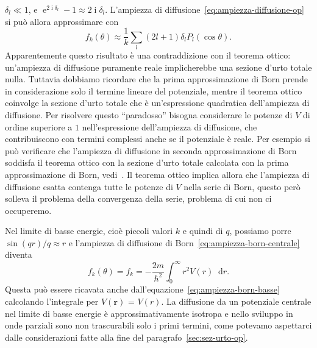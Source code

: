 \documentclass[a4paper,fleqn,twoside,12pt]{article}
\newcommand*{\dd}{\mathop{}\!\mathrm{d}} %
\DeclareMathOperator{\e}{\mathrm{e}} %
\DeclareMathOperator{\uimm}{\mathrm{i}} %
\begin{document}
$\delta_{l} \ll 1$, e $\e^{2\uimm \delta_{l}} - 1 \approx 2\uimm \delta_{l}$.
L'ampiezza di diffusione~\eqref{eq:ampiezza-diffusione-op} si può allora
approssimare con
\begin{equation}
  f_{k}(\theta) \approx \frac{1}{k}\sum_{l}(2l+1) \delta_{l} P_{l}(\cos\theta).
\end{equation}
Apparentemente questo risultato è una contraddizione con il teorema ottico:
un'ampiezza di diffusione puramente reale implicherebbe una sezione d'urto
totale nulla.  Tuttavia dobbiamo ricordare che la prima approssimazione di Born
prende in considerazione solo il termine lineare del potenziale, mentre il
teorema ottico coinvolge la sezione d'urto totale che è un'espressione
quadratica dell'ampiezza di diffusione.  Per risolvere questo ``paradosso''
bisogna considerare le potenze di $V$ di ordine superiore a $1$ nell'espressione
dell'ampiezza di diffusione, che contribuiscono con termini complessi anche se
il potenziale è reale.  Per esempio si può verificare che l'ampiezza di
diffusione in seconda approssimazione di Born soddisfa il teorema ottico con la
sezione d'urto totale calcolata con la prima approssimazione di Born,
vedi~\textcite[361-362]{gottfried:quantum-mechanics}.  Il teorema ottico implica
allora che l'ampiezza di diffusione esatta contenga tutte le potenze di $V$
nella serie di Born, questo però solleva il problema della convergenza della
serie, problema di cui non ci occuperemo.

Nel limite di basse energie, cioè piccoli valori $k$ e quindi di $q$, possiamo
porre $\sin(qr)/q \approx r$ e l'ampiezza di diffusione di
Born~\eqref{eq:ampiezza-born-centrale} diventa
\begin{equation}
  \label{eq:ampiezza-born-centrale-basse}
  f_{k}(\theta) = f_{k} = -\frac{2m}{\hslash^{2}} \int_{0}^{\infty} r^{2}V(r)
  \dd r.
\end{equation}
Questa può essere ricavata anche dall'equazione~\eqref{eq:ampiezza-born-basse}
calcolando l'integrale per $V(\bm{r})$ = $V(r)$.  La diffusione da un potenziale
centrale nel limite di basse energie è approssimativamente isotropa e nello
sviluppo in onde parziali sono non trascurabili solo i primi termini, come
potevamo aspettarci dalle considerazioni fatte alla fine del
paragrafo~\ref{sec:sez-urto-op}.
\end{document}
